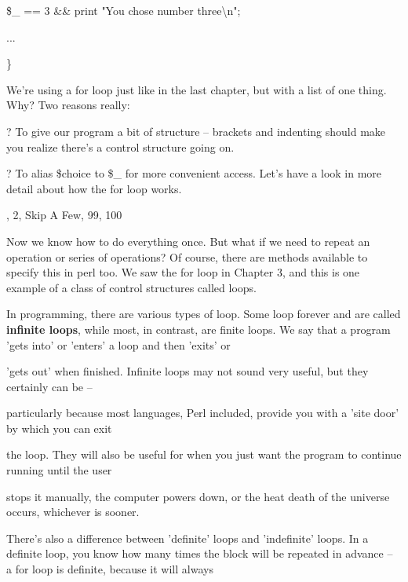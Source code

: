 \documentclass[a4paper,11pt]{book}
\begin{document}
\noindent \$\_  == 3 \&\& print "You chose number three\textbackslash n";

\noindent ...

\noindent \}

\noindent 

\noindent We're using a for loop just like in the last chapter, but with a list of one thing. Why? Two reasons really:

\noindent 

\noindent ? To give our program a bit of structure -- brackets and indenting should make you realize there's a control structure going on.

\noindent 

? To alias \$choice to \$\_ for more convenient access. Let's have a look in more detail about how the for loop works.

\noindent 

, 2, Skip A Few, 99, 100

\noindent 

\noindent Now we know how to do everything once. But what if we need to repeat an operation or series of operations? Of course, there are methods available to specify this in perl too. We saw the for loop in Chapter 3, and this is one example of a class of control structures called loops.

\noindent 

\noindent In programming, there are various types of loop. Some loop forever and are called \textbf{infinite loops}, while most, in contrast, are finite loops. We say that a program 'gets into' or 'enters' a loop and then 'exits' or

\noindent 'gets out' when finished. Infinite loops may not sound very useful, but they certainly can be --

\noindent particularly because most languages, Perl included, provide you with a 'site door' by which you can exit

\noindent 

\noindent 

\noindent the loop. They will also be useful for when you just want the program to continue running until the user

\noindent stops it manually, the computer powers down, or the heat death of the universe occurs, whichever is sooner.

\noindent 

\noindent There's also a difference between 'definite' loops and 'indefinite' loops. In a definite loop, you know how many times the block will be repeated in advance -- a for loop is definite, because it will always
\end{document}
